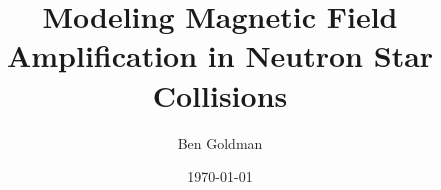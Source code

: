 \documentclass{beamer}
\title{Modeling Magnetic Field Amplification in Neutron Star Collisions}
\author{Ben Goldman}
\date{\today}
\newcommand{\myfig}[4]{
  \begin{figure}
    \centering
    \texttt{[image: figures/\#1]}
    \caption{#2}
    \label{fig:#4}
  \end{figure}
}
\begin{document}
\begin{frame}
  \maketitle
\begin{columns}
  \begin{column}{0.6\textwidth}
  \end{column}
\end{columns}
\end{frame}
\end{document}

